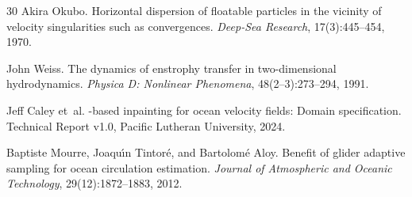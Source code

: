 \documentclass{article}
\begin{document}
\begin{thebibliography}{30}
Akira Okubo.
\newblock Horizontal dispersion of floatable particles in the vicinity of velocity singularities such as convergences.
\newblock \emph{Deep-Sea Research}, 17(3):445--454, 1970.

John Weiss.
\newblock The dynamics of enstrophy transfer in two-dimensional hydrodynamics.
\newblock \emph{Physica D: Nonlinear Phenomena}, 48(2--3):273--294, 1991.

Jeff Caley et~al.
-based inpainting for ocean velocity fields: Domain specification.
\newblock Technical Report v1.0, Pacific Lutheran University, 2024.

Baptiste Mourre, Joaqu\'{\i}n Tintor\'{e}, and Bartolom\'{e} Aloy.
\newblock Benefit of glider adaptive sampling for ocean circulation estimation.
\newblock \emph{Journal of Atmospheric and Oceanic Technology}, 29(12):1872--1883, 2012.

\end{thebibliography}
\end{document}

